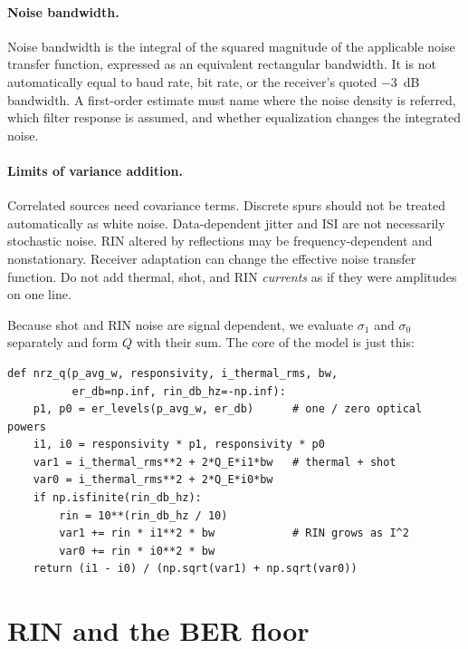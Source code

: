 \paragraph{Noise bandwidth.}
Noise bandwidth is the integral of the squared magnitude of the applicable noise
transfer function, expressed as an equivalent rectangular bandwidth. It is not
automatically equal to baud rate, bit rate, or the receiver's quoted $-3$~dB
bandwidth. A first-order estimate must name where the noise density is referred,
which filter response is assumed, and whether equalization changes the integrated
noise.

\paragraph{Limits of variance addition.}
Correlated sources need covariance terms. Discrete spurs should not be treated
automatically as white noise. Data-dependent jitter and ISI are not necessarily
stochastic noise. RIN altered by reflections may be frequency-dependent and
nonstationary. Receiver adaptation can change the effective noise transfer
function. Do not add thermal, shot, and RIN \emph{currents} as if they were
amplitudes on one line.

Because shot and RIN noise are signal dependent, we evaluate $\sigma_1$ and
$\sigma_0$ separately and form $Q$ with their sum. The core of the model is just
this:

\begin{lstlisting}
def nrz_q(p_avg_w, responsivity, i_thermal_rms, bw,
          er_db=np.inf, rin_db_hz=-np.inf):
    p1, p0 = er_levels(p_avg_w, er_db)      # one / zero optical powers
    i1, i0 = responsivity * p1, responsivity * p0
    var1 = i_thermal_rms**2 + 2*Q_E*i1*bw   # thermal + shot
    var0 = i_thermal_rms**2 + 2*Q_E*i0*bw
    if np.isfinite(rin_db_hz):
        rin = 10**(rin_db_hz / 10)
        var1 += rin * i1**2 * bw            # RIN grows as I^2
        var0 += rin * i0**2 * bw
    return (i1 - i0) / (np.sqrt(var1) + np.sqrt(var0))
\end{lstlisting}

\section{RIN and the BER floor}
\label{sec:rin}

